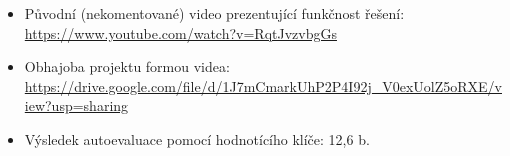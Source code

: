 \documentclass[a4paper, 11pt]{article}
\begin{document}
\begin{itemize}
    \item Původní (nekomentované) video prezentující funkčnost
    řešení: \url{https://www.youtube.com/watch?v=RqtJvzvbgGs}
    \item Obhajoba projektu formou videa: 
    \url{https://drive.google.com/file/d/1J7mCmarkUhP2P4I92j_V0exUolZ5oRXE/view?usp=sharing}
    \item Výsledek autoevaluace pomocí hodnotícího klíče: 12,6 b.
\end{itemize}
\end{document}
